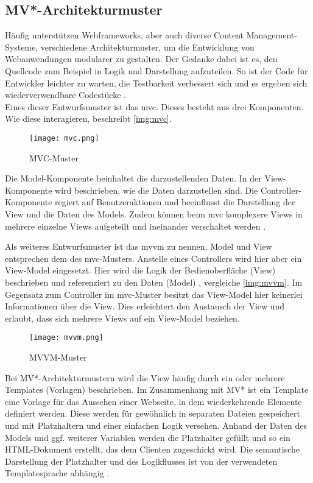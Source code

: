 \subsection{MV*-Architekturmuster}
Häufig unterstützen Webframeworks, aber auch diverse Content Management-Systeme, verschiedene Architekturmuster, um die Entwicklung von Webanwendungen modularer zu gestalten. Der Gedanke dabei ist es, den Quellcode zum Beispiel in Logik und Darstellung aufzuteilen. So ist der Code für Entwickler leichter zu warten, die Testbarkeit verbessert sich und es ergeben sich wiederverwendbare Codestücke \cite[S. 34]{ste15}. \\
Eines dieser Entwurfsmuster ist das \ac{mvc}. Dieses besteht aus drei Komponenten. Wie diese interagieren, beschreibt \autoref{img:mvc}.

\begin{figure}[H]
	\begin{center}
		\texttt{[image: mvc.png]}
		\caption{MVC-Muster}
		\label{img:mvc}
	\end{center}
\end{figure}

Die Model-Komponente beinhaltet die darzustellenden Daten. In der View-Komponente wird beschrieben, wie die Daten darzustellen sind. Die Controller-Komponente regiert auf Benutzeraktionen und beeinflusst die Darstellung der View und die Daten des Models. Zudem können beim \ac{mvc} komplexere Views in mehrere einzelne Views aufgeteilt und ineinander verschaltet werden \cite[S. 5 ff.]{gof}.

Als weiteres Entwurfsmuster ist das \ac{mvvm} zu nennen. Model und View entsprechen dem des \ac{mvc}-Musters. Anstelle eines Controllers wird hier aber ein View-Model eingesetzt. Hier wird die Logik der Bedienoberfläche (View) beschrieben und referenziert zu den Daten (Model) \cite[S. 40]{mvvm}, vergleiche \autoref{img:mvvm}. Im Gegensatz zum Controller im \ac{mvc}-Muster besitzt das View-Model hier keinerlei Informationen über die View. Dies erleichtert den Austausch der View und erlaubt, dass sich mehrere Views auf ein View-Model beziehen.

\begin{figure}[H]
	\begin{center}
		\texttt{[image: mvvm.png]}
		\caption{MVVM-Muster}
		\label{img:mvvm}
	\end{center}
\end{figure}

Bei MV*-Architekturmustern wird die View häufig durch ein oder mehrere Templates (Vorlagen) beschrieben. Im Zusammenhang mit MV* ist ein Template eine Vorlage für das Aussehen einer Webseite, in dem wiederkehrende Elemente definiert werden. Diese werden für gewöhnlich in separaten Dateien gespeichert und mit Platzhaltern und einer einfachen Logik versehen. Anhand der Daten des Models und ggf. weiterer Variablen werden die Platzhalter gefüllt und so ein HTML-Dokument erstellt, das dem Clienten zugeschickt wird. Die semantische Darstellung der Platzhalter und des Logikflusses ist von der verwendeten Templatesprache abhängig \cite[S. 37]{newman2008django}.